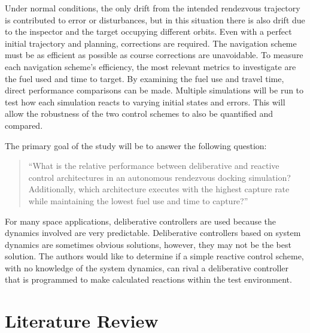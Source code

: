 \documentclass[journal, 10pt]{IEEEtran}
\begin{document}
Under normal conditions, the only drift from the intended rendezvous trajectory is contributed to error or disturbances, but in this situation there is also drift due to the inspector and the target occupying different orbits.  Even with a perfect initial trajectory and planning, corrections are required.  The navigation scheme must be as efficient as possible as course corrections are unavoidable. To measure each navigation scheme's efficiency, the most relevant metrics to investigate are the fuel used and time to target.  By examining the fuel use and travel time, direct performance comparisons can be made.  Multiple simulations will be run to test how each simulation reacts to varying initial states and errors.  This will allow the robustness of the two control schemes to also be quantified and compared.

The primary goal of the study will be to answer the following question:

\begin{quote}
``What is the relative performance between deliberative and reactive control architectures in an autonomous rendezvous docking simulation? Additionally, which architecture executes with the highest capture rate while maintaining the lowest fuel use and time to capture?''
\end{quote}

For many space applications, deliberative controllers are used because the dynamics involved are very predictable. Deliberative controllers based on system dynamics are sometimes obvious solutions, however, they may not be the best solution.  The authors would like to determine if a simple reactive control scheme, with no knowledge of the system dynamics, can rival a deliberative controller that is programmed to make calculated reactions within the test environment.

\section{Literature Review}
\end{document}
